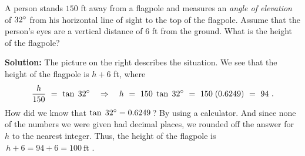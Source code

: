 \vspace{2mm}
\begin{exmp}
 A person stands $150$ ft away from a flagpole and measures an \emph{angle of
 elevation} of $32^\circ$ from his horizontal line of sight to the top
 of the flagpole. Assume that the person's eyes are a vertical distance of 6 ft from the ground.
 What is the height of the flagpole?
 \par\noindent\textbf{Solution:} The picture on the right describes the situation. We see that the
 height of the flagpole is $h + 6$ ft, where
 \begin{displaymath}
  \frac{h}{150} ~=~ \tan\;32^\circ \quad\Rightarrow\quad h ~=~ 150\;\tan\;32^\circ 
  ~=~ 150\;(0.6249) ~=~ 94 ~.
 \end{displaymath}
 How did we know that $\tan\;32^\circ = 0.6249\,$? By using a calculator. And since none of the
 numbers we were given had decimal places, we rounded off the answer for $h$ to the nearest integer.
 Thus, the height of the flagpole is $\,h + 6 = 94 + 6 = \boxed{100 ~\text{ft}}$ .
\end{exmp}\vspace{1mm}
